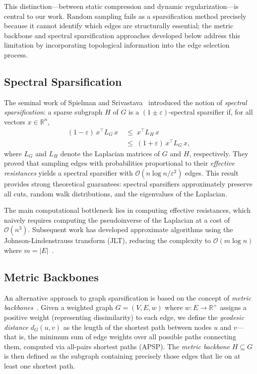 \documentclass[conference]{IEEEtran}
\begin{document}
This distinction---between static compression and dynamic regularization---is central to our work. Random sampling fails as a sparsification method precisely because it cannot identify which edges are structurally essential; the metric backbone and spectral sparsification approaches developed below address this limitation by incorporating topological information into the edge selection process.

\subsection{Spectral Sparsification}

The seminal work of Spielman and Srivastava~\cite{spielman2008} introduced the notion of \emph{spectral sparsification}: a sparse subgraph $H$ of $G$ is a $(1 \pm \varepsilon)$-spectral sparsifier if, for all vectors $x \in \mathbb{R}^n$,
\begin{equation}
\begin{split}
    (1 - \varepsilon) \, x^\top L_G \, x &\;\leq\; x^\top L_H \, x \\
    &\;\leq\; (1 + \varepsilon) \, x^\top L_G \, x,
\end{split}
    \label{eq:spectral_sparsifier}
\end{equation}
where $L_G$ and $L_H$ denote the Laplacian matrices of $G$ and $H$, respectively. They proved that sampling edges with probabilities proportional to their \emph{effective resistances} yields a spectral sparsifier with $\mathcal{O}(n \log n / \varepsilon^2)$ edges. This result provides strong theoretical guarantees: spectral sparsifiers approximately preserve all cuts, random walk distributions, and the eigenvalues of the Laplacian.

The main computational bottleneck lies in computing effective resistances, which naively requires computing the pseudoinverse of the Laplacian at a cost of $\mathcal{O}(n^3)$. Subsequent work has developed approximate algorithms using the Johnson-Lindenstrauss transform (JLT), reducing the complexity to $\mathcal{O}(m \log n)$ where $m = |E|$~\cite{spielman2011}.

\subsection{Metric Backbones}

An alternative approach to graph sparsification is based on the concept of \emph{metric backbones}~\cite{dreveton2024}. Given a weighted graph $G = (V, E, w)$ where $w: E \to \mathbb{R}^+$ assigns a positive weight (representing dissimilarity) to each edge, we define the \emph{geodesic distance} $d_G(u, v)$ as the length of the shortest path between nodes $u$ and $v$---that is, the minimum sum of edge weights over all possible paths connecting them, computed via all-pairs shortest paths (APSP). The \emph{metric backbone} $H \subseteq G$ is then defined as the subgraph containing precisely those edges that lie on at least one shortest path.
\end{document}
